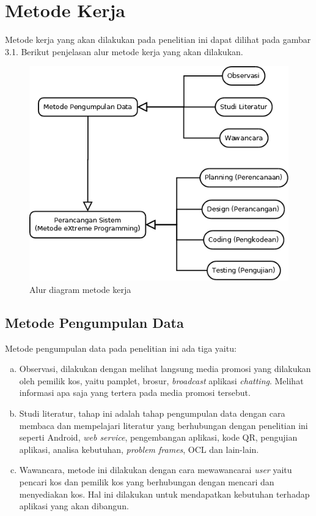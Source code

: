 \section{Metode Kerja}
Metode kerja yang akan dilakukan pada penelitian ini dapat dilihat pada gambar 3.1. Berikut penjelasan alur metode kerja yang akan dilakukan.
	\begin{figure}[H]
		\centering
		\includegraphics[scale=0.5]{gambar/alur}
		\caption{Alur diagram metode kerja}
		\label{alur}
	\end{figure}

\subsection{Metode Pengumpulan Data}
Metode pengumpulan data pada penelitian ini ada tiga yaitu:
\begin{enumerate}[a.]
	\item Observasi, dilakukan dengan melihat langsung media promosi yang dilakukan oleh pemilik kos, yaitu pamplet, brosur, \textit{broadcast} aplikasi \textit{chatting}. Melihat informasi apa saja yang tertera pada media promosi tersebut.
	\item Studi literatur, tahap ini adalah tahap pengumpulan data dengan cara membaca dan mempelajari literatur yang berhubungan dengan penelitian ini seperti Android, \textit{web service}, pengembangan aplikasi, kode QR, pengujian aplikasi, analisa kebutuhan, \textit{problem frames}, OCL dan lain-lain.
	\item Wawancara, metode ini dilakukan dengan cara mewawancarai \textit{user} yaitu pencari kos dan pemilik kos yang berhubungan dengan mencari dan menyediakan kos. Hal ini dilakukan untuk mendapatkan kebutuhan terhadap aplikasi yang akan dibangun. 
\end{enumerate}

